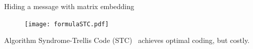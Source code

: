 \documentclass[10pt,aspectratio=169]{beamer}
\begin{document}
\begin{frame}{Hiding a message with matrix embedding}
    \begin{figure}[h]
        \texttt{[image: formulaSTC.pdf]}
    \end{figure}
    \pause
    Algorithm Syndrome-Trellis Code (STC)~ achieves optimal coding, but costly.
\end{frame}





\end{document}

